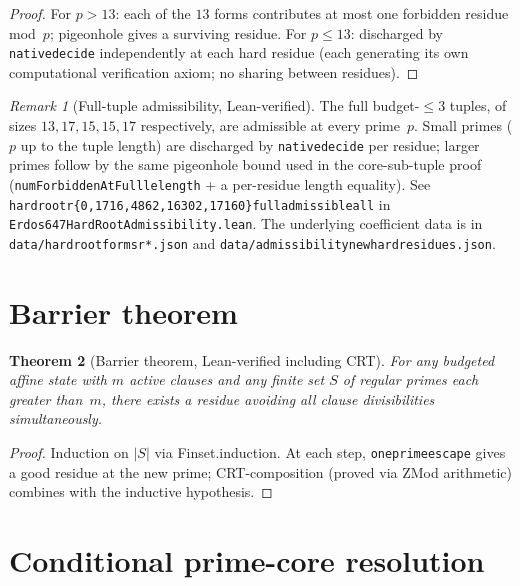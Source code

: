 \documentclass[11pt]{article}
\renewcommand{\_}{\origunderscore\allowbreak}
\newtheorem{theorem}{Theorem}[section]
\theoremstyle{definition}
\theoremstyle{remark}
\newtheorem{remark}[theorem]{Remark}
\begin{document}
\begin{proof}
For $p>13$: each of the $13$ forms contributes at most one forbidden
residue mod~$p$; pigeonhole gives a surviving residue.
For $p\le 13$: discharged by \texttt{native\_decide} independently
at each hard residue (each generating its own computational
verification axiom; no sharing between residues).
\end{proof}

\begin{remark}[Full-tuple admissibility, Lean-verified]
The full budget-$\le 3$ tuples, of sizes $13,17,15,15,17$ respectively,
are admissible at every prime~$p$. Small primes ($p$ up to the tuple
length) are discharged by \texttt{native\_decide} per residue; larger
primes follow by the same pigeonhole bound used in the core-sub-tuple
proof (\texttt{numForbiddenAtFull\_le\_length} + a per-residue length
equality). See \texttt{hard\_root\_r\_\{0,1716,4862,16302,17160\}\_full\_admissible\_all}
in \texttt{Erdos647HardRootAdmissibility.lean}. The underlying
coefficient data is in \texttt{data/hard\_root\_forms\_r*.json} and
\texttt{data/admissibility\_new\_hard\_residues.json}.
\end{remark}

\section{Barrier theorem}\label{sec:barrier}

\begin{theorem}[Barrier theorem, Lean-verified including CRT]
For any budgeted affine state with $m$ active clauses and any
finite set $S$ of regular primes each greater than~$m$, there
exists a residue avoiding all clause divisibilities simultaneously.
\end{theorem}

\begin{proof}
Induction on $|S|$ via Finset.induction. At each step,
\texttt{one\_prime\_escape} gives a good residue at the new prime;
CRT-composition (proved via ZMod arithmetic) combines with the
inductive hypothesis.
\end{proof}

\section{Conditional prime-core resolution}\label{sec:conditional}
\end{document}
